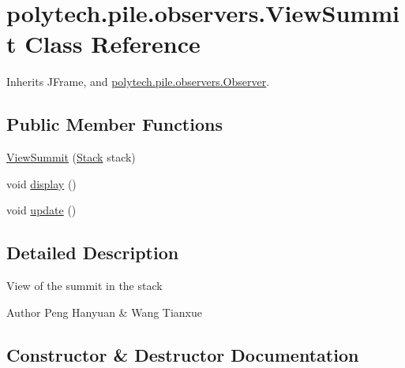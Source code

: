 \hypertarget{classpolytech_1_1pile_1_1observers_1_1_view_summit}{}\section{polytech.\+pile.\+observers.\+View\+Summit Class Reference}
\label{classpolytech_1_1pile_1_1observers_1_1_view_summit}


Inherits J\+Frame, and \hyperlink{interfacepolytech_1_1pile_1_1observers_1_1_observer}{polytech.\+pile.\+observers.\+Observer}.

\subsection*{Public Member Functions}
\begin{DoxyCompactItemize}
\item 
\hyperlink{classpolytech_1_1pile_1_1observers_1_1_view_summit_ad0a10d086f264ff9d0846b85e7be41ac}{View\+Summit} (\hyperlink{classpolytech_1_1pile_1_1subject_1_1_stack}{Stack} stack)
\item 
void \hyperlink{classpolytech_1_1pile_1_1observers_1_1_view_summit_a5906b18ace7f7c8ada6b7d396fe48f1d}{display} ()
\item 
void \hyperlink{classpolytech_1_1pile_1_1observers_1_1_view_summit_a4d486c1e5589b2cba84ea9fee25befb5}{update} ()
\end{DoxyCompactItemize}


\subsection{Detailed Description}
View of the summit in the stack

\begin{DoxyAuthor}{Author}
Peng Hanyuan \& Wang Tianxue 
\end{DoxyAuthor}


\subsection{Constructor \& Destructor Documentation}
\hypertarget{classpolytech_1_1pile_1_1observers_1_1_view_summit_ad0a10d086f264ff9d0846b85e7be41ac}{}\label{classpolytech_1_1pile_1_1observers_1_1_view_summit_ad0a10d086f264ff9d0846b85e7be41ac} 
